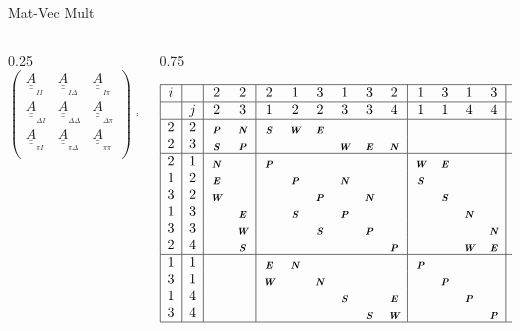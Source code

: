 \documentclass[handout]{beamer}
\newcommand{\Matriz}[1]{\underline{\underline{#1}}}
\newcommand{\SubScript}[1]{_{_{#1}}}
\newcommand{\mbiu}[1]{_{\textbf{\em #1}}}
\begin{document}
\begin{frame}{Mat-Vec Mult}
\begin{columns}
\begin{column}{0.25\textwidth}
{\footnotesize{
\[\left(
\begin{array}{ccc}
\Matriz{A}\SubScript{II} & \Matriz{A}\SubScript{I\Delta} & \Matriz{A}\SubScript{I\pi} \\
\Matriz{A}\SubScript{\Delta I} & \Matriz{A}\SubScript{\Delta \Delta} & \Matriz{A}\SubScript{\Delta \pi} \\
\Matriz{A}\SubScript{\pi I} & \Matriz{A}\SubScript{\pi \Delta} & \Matriz{A}\SubScript{\pi \pi} \\
\end{array}\right) =
\]
}}
\end{column}
\begin{column}{0.75\textwidth}
\begin{tiny}
\begin{equation*}
\begin{array}{|c|c|cc|cccccc|cccc|c|}
\hline
i  &   & 2 & 2 & 2 & 1 & 3 & 1 & 3 & 2 & 1 & 3 & 1 & 3 & DP\\
\hline
   & j & 2 & 3 & 1 & 2 & 2 & 3 & 3 & 4 & 1 & 1 & 4 & 4 & \\
\hline
2 & 2 & \mbiu{P} & \mbiu{N} & \mbiu{S} & \mbiu{W} & \mbiu{E} &  &  &  &  &  &  &  &I \\
2 & 3 & \mbiu{S} & \mbiu{P} &          &          &          & \mbiu{W} & \mbiu{E} & \mbiu{N} &  &  &  &  & I \\
\hline
2 & 1 & \mbiu{N} &  & \mbiu{P} &  &          &  &  &  & \mbiu{W} & \mbiu{E} &  &  & \Delta \\
1 & 2 & \mbiu{E} &  &  & \mbiu{P} &  & \mbiu{N} &  &  & \mbiu{S} &  &   &  & \Delta \\
3 & 2 & \mbiu{W} &  &  &  & \mbiu{P} &  & \mbiu{N} &  &  & \mbiu{S} &   &  & \Delta \\
1 & 3 &  & \mbiu{E} &  & \mbiu{S} &  & \mbiu{P} &  &  &  &  & \mbiu{N} &  & \Delta \\
3 & 3 &  & \mbiu{W} &  &  & \mbiu{S} &  & \mbiu{P} &  &  &  &  & \mbiu{N} & \Delta  \\
2 & 4 &  & \mbiu{S} &  &  &          &  &  & \mbiu{P} &  &  & \mbiu{W} & \mbiu{E} & \Delta  \\
\hline
1 & 1 &   &   & \mbiu{E} & \mbiu{N} &  &  &  &          & \mbiu{P} &  &  &  & \pi \\
3 & 1 &   &   & \mbiu{W} &  & \mbiu{N} &  &  &          &  & \mbiu{P} &  &  & \pi \\
1 & 4 &   &   &          &  &  & \mbiu{S} &  & \mbiu{E} &  &  & \mbiu{P} &  & \pi \\
3 & 4 &   &   &          &  &  &  & \mbiu{S} & \mbiu{W} &  &  &  & \mbiu{P} & \pi \\
\hline
\end{array}
\end{equation*}
\end{tiny}
\end{column}
\end{columns}

\end{frame}
\end{document}
